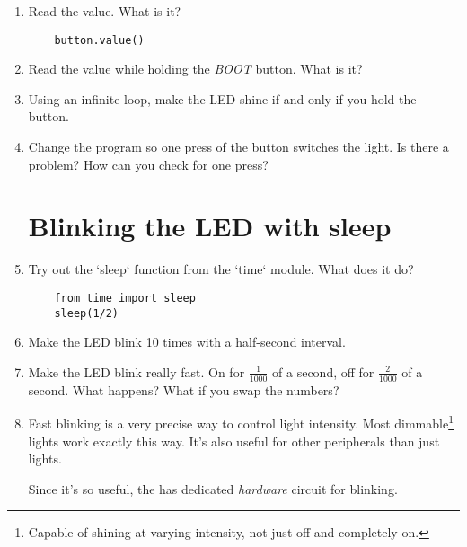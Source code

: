 \documentclass{../tutorial}
\begin{document}
\begin{enumerate}
\item
    Read the value. What is it?

    \begin{lstlisting}
    button.value()
    \end{lstlisting}

\item
    Read the value while holding the \emph{BOOT} button. What is it?

    \begin{comment}
        The \emph{BOOT} button is next to the USB connector.
        Don't confuse it with \emph{EN}!
    \end{comment}

\item
    Using an infinite loop, make the LED shine if and only if you hold the button.

\item
    Change the program so one press of the button switches the light.
    Is there a problem? How can you check for one press?

\section{Blinking the LED with sleep}

\item
    Try out the `sleep` function from the `time` module.
    What does it do?

    \begin{lstlisting}
    from time import sleep
    sleep(1/2)
    \end{lstlisting}

\item
    Make the LED blink 10 times with a half-second interval.

\item
    Make the LED blink really fast.
    On for $\frac{1}{1000}$ of a second, off for $\frac{2}{1000}$ of a second.
    What happens? What if you swap the numbers?

\item
    Fast blinking is a very precise way to control light intensity.
    Most dimmable\footnote{
        Capable of shining at varying intensity, not just off and completely on.
    } lights work exactly this way.
    It's also useful for other peripherals than just lights.

    Since it's so useful, the  has dedicated \emph{hardware }
    circuit for blinking.


\end{enumerate}
\end{document}
